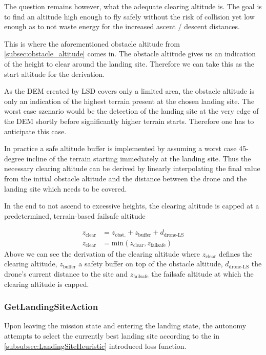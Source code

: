 The question remains however, what the adequate clearing altitude is. The goal is to find an altitude high enough to fly safely without the risk of collision yet low enough as to not waste energy for the increased ascent / descent distances.

This is where the aforementioned obstacle altitude from \cref{subsec:obstacle_altitude} comes in. The obstacle altitude gives us an indication of the height to clear around the landing site. Therefore we can take this as the start altitude for the derivation.

As the DEM created by LSD covers only a limited area, the obstacle altitude is only an indication of the highest terrain present at the chosen landing site. The worst case szenario would be the detection of the landing site at the very edge of the DEM shortly before significantly higher terrain starts. Therefore one has to anticipate this case. 

In practice a safe altitude buffer is implemented by assuming a worst case 45-degree incline of the terrain starting immediately at the landing site. Thus the necessary clearing altitude can be derived by linearly interpolating the final value from the initial obstacle altitude and the distance between the drone and the landing site which needs to be covered.

In the end to not ascend to excessive heights, the clearing altitude is capped at a predetermined, terrain-based failsafe altitude

\begin{align}
    z_{\text{clear}} &= z_{\text{obst.}} + z_{\text{buffer}} + d_{\text{drone-LS}}\\
    z_{\text{clear}} &= \text{min}\left(z_{\text{clear}}, z_{\text{failsafe}}\right)
\end{align}
Above we can see the derivation of the clearing altitude where $z_{\text{clear}}$ defines the clearing altitude, $z_{\text{buffer}}$ a safety buffer on top of the obstacle altitude, $d_{\text{drone-LS}}$ the drone's current distance to the site and $z_{\text{failsafe}}$ the failsafe altitude at which the clearing altitude is capped.


\subsubsection{GetLandingSiteAction}

Upon leaving the mission state and entering the landing state, the autonomy attempts to select the currently best landing site according to the in \cref{subsubsec:LandingSiteHeuristic} introduced loss function.

